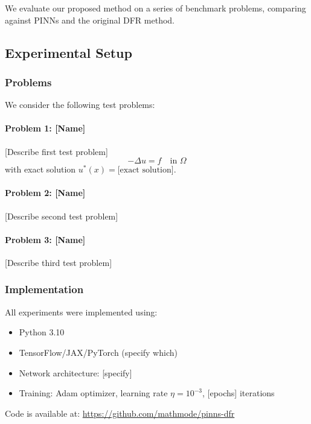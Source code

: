
We evaluate our proposed method on a series of benchmark problems, comparing against PINNs and the original DFR method.

\subsection{Experimental Setup}

\subsubsection{Problems}

We consider the following test problems:

\paragraph{Problem 1: [Name]}
[Describe first test problem]
\begin{equation}
    -\Delta u = f \quad \text{in } \Omega
\end{equation}
with exact solution $u^*(x) = \text{[exact solution]}$.

\paragraph{Problem 2: [Name]}
[Describe second test problem]

\paragraph{Problem 3: [Name]}
[Describe third test problem]

\subsubsection{Implementation}

All experiments were implemented using:
\begin{itemize}
    \item Python 3.10
    \item TensorFlow/JAX/PyTorch (specify which)
    \item Network architecture: [specify]
    \item Training: Adam optimizer, learning rate $\eta = 10^{-3}$, [epochs] iterations
\end{itemize}

Code is available at: \url{https://github.com/mathmode/pinns-dfr}

